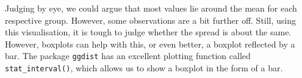 \documentclass[
  letterpaper,
]{krantz}
\makeatletter
\newenvironment{Shaded}{\begin{snugshade}}{\end{snugshade}}
\newcommand{\AttributeTok}[1]{\textcolor[rgb]{0.40,0.45,0.13}{#1}}
\newcommand{\DecValTok}[1]{\textcolor[rgb]{0.68,0.00,0.00}{#1}}
\newcommand{\FloatTok}[1]{\textcolor[rgb]{0.68,0.00,0.00}{#1}}
\newcommand{\FunctionTok}[1]{\textcolor[rgb]{0.28,0.35,0.67}{#1}}
\newcommand{\NormalTok}[1]{\textcolor[rgb]{0.00,0.23,0.31}{#1}}
\newcommand{\SpecialCharTok}[1]{\textcolor[rgb]{0.37,0.37,0.37}{#1}}
\newcommand{\StringTok}[1]{\textcolor[rgb]{0.13,0.47,0.30}{#1}}
\newenvironment{kframe}{%
\medskip{}
\setlength{\fboxsep}{.8em}
 \def\at@end@of@kframe{}%
 \ifinner\ifhmode%
  \def\at@end@of@kframe{\end{minipage}}%
  \begin{minipage}{\columnwidth}%
 \fi\fi%
 \def\FrameCommand##1{\hskip\@totalleftmargin \hskip-\fboxsep
 \colorbox{shadecolor}{##1}\hskip-\fboxsep
     \hskip-\linewidth \hskip-\@totalleftmargin \hskip\columnwidth}%
 \MakeFramed {\advance\hsize-\width
   \@totalleftmargin\z@ \linewidth\hsize
   \@setminipage}}%
 {\par\unskip\endMakeFramed%
 \at@end@of@kframe}
\renewenvironment{Shaded}{\begin{kframe}}{\end{kframe}}
\makeatother
\begin{document}
\begin{Shaded}
\end{Shaded}

\begin{figure}[H]


\caption{\label{fig-homogeneity-variance}}

\end{figure}%

Judging by eye, we could argue that most values lie around the mean for
each respective group. However, some observations are a bit further off.
Still, using this visualisation, it is tough to judge whether the spread
is about the same. However, boxplots can help with this, or even better,
a boxplot reflected by a bar. The package \texttt{ggdist} has an
excellent plotting function called \texttt{stat\_interval()}, which
allows us to show a boxplot in the form of a bar.
\end{document}
